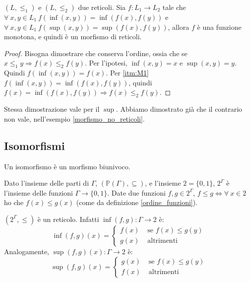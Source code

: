 \begin{prop}
$(L, \le_1)$ e $(L, \le_2)$ due reticoli. Sia $f : L_1 \to L_2$ tale che $\forall \ x, y \in L_1 \ f(\inf(x,y)) = \inf (f(x),f(y))$ e $\forall \ x, y \in L_1 \ f(\sup(x,y)) = \sup (f(x),f(y))$, allora $f$ \`e una funzione monotona, e quindi \`e un morfismo di reticoli.
\end{prop}
\begin{proof}
Bisogna dimostrare che conserva l'ordine, ossia che se $x \le_1 y \Rightarrow f(x) \le_2 f(y)$. Per l'ipotesi, $\inf(x,y) = x$ e $\sup(x,y)= y$. Quindi $f(\inf(x,y)) = f(x)$. Per \ref{itm:M1} $f(\inf(x,y)) = \inf(f(x),f(y))$, quindi $f(x) = \inf(f(x),f(y)) \Rightarrow f(x) \le_2 f(y)$.
\end{proof}
Stessa dimostrazione vale per il $\sup$. Abbiamo dimostrato gi\`a che il contrario non vale, nell'esempio \ref{morfismo_no_reticoli}.

\subsection{Isomorfismi}
Un isomorfismo \`e un morfismo biunivoco.

Dato l'insieme delle parti di $\Gamma$, $(\mathbb{P}(\Gamma), \subseteq)$, e l'insieme $2 = \{ 0, 1 \}$, $2^{\Gamma}$ \`e l'insieme delle funzioni $\Gamma \to \{0,1\}$. Date due funzioni $f, g \in 2^{\Gamma}$, $f \le g \Leftrightarrow \forall \ x \in 2 $ ho che $ f(x) \le g(x)$ (come da  definizione \ref{ordine_funzioni}). 

$(2^{\Gamma}, \le)$ \`e un reticolo. Infatti $\inf(f,g) : \Gamma \to 2$ \`e:
\[
\inf(f,g)(x) = 
\begin{cases}
f(x) & \text{ se } f(x) \le g(y) \\
g(x) & \text{ altrimenti}
\end{cases}
\]
Analogamente, $\sup(f,g)(x) : \Gamma \to 2$ \`e:
\[
\sup(f,g)(x) = 
\begin{cases}
g(x) & \text{ se } f(x) \le g(y) \\
f(x) & \text{ altrimenti}
\end{cases}
\]

